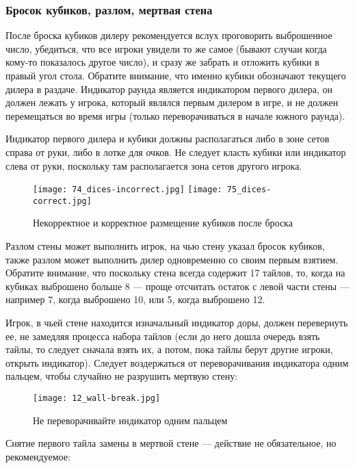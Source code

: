 \subsubsection{Бросок кубиков, разлом, мертвая стена}

После броска кубиков дилеру рекомендуется вслух проговорить выброшенное число, убедиться, что все игроки увидели то же самое (бывают случаи когда кому-то показалось другое число), и сразу же забрать и отложить кубики в правый угол стола. Обратите внимание, что именно кубики обозначают текущего дилера в раздаче. Индикатор раунда является индикатором первого дилера, он должен лежать у игрока, который являлся первым дилером в игре, и не должен перемещаться во время игры (только переворачиваться в начале южного раунда).

Индикатор первого дилера и кубики должны располагаться либо в зоне сетов справа от руки, либо в лотке для очков. Не следует класть кубики или индикатор слева от руки, поскольку там располагается зона сетов другого игрока.

\begin{figure}[H]
	\centering
	\texttt{[image: 74\_dices-incorrect.jpg]}
	\texttt{[image: 75\_dices-correct.jpg]}
	\caption{Некорректное и корректное размещение кубиков после броска}
\end{figure}

Разлом стены может выполнить игрок, на чью стену указал бросок кубиков, также разлом может выполнить дилер одновременно со своим первым взятием. Обратите внимание, что поскольку стена всегда содержит 17 тайлов, то, когда на кубиках выброшено больше 8 --- проще отсчитать остаток с левой части стены --- например 7, когда выброшено 10, или 5, когда выброшено 12.

Игрок, в чьей стене находится изначальный индикатор доры, должен перевернуть ее, не замедляя процесса набора тайлов (если до него дошла очередь взять тайлы, то следует сначала взять их, а потом, пока тайлы берут другие игроки, открыть индикатор). Следует воздержаться от переворачивания индикатора одним пальцем, чтобы случайно не разрушить мертвую стену:

\begin{figure}[H]
	\centering
	\texttt{[image: 12\_wall-break.jpg]}
	\caption{Не переворачивайте индикатор одним пальцем}
\end{figure}

Снятие первого тайла замены в мертвой стене --- действие не обязательное, но рекомендуемое:

